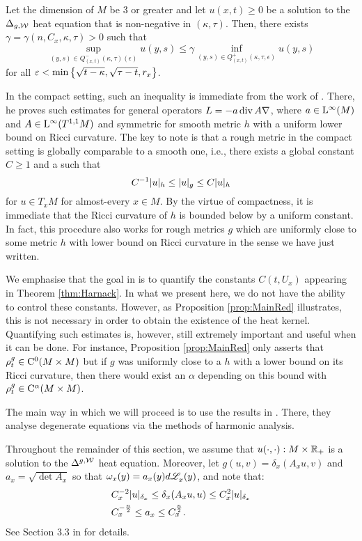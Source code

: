 \documentclass[a4paper, 12pt]{amsart}
\begin{document}
\begin{thm}
\label{thm:Harnack}
Let the dimension of $M$ be $3$ or greater 
and let $u(x,t) \geq 0$ be a 
solution to the $\Delta_{g,\mathcal{W}}$ heat equation 
that is non-negative in $(\kappa, \tau)$. 
Then, there exists $\gamma = \gamma(n, C_x, \kappa, \tau) > 0$ such that 
$$ \sup_{(y,s) \in Q^-_{(x,t)}(\kappa, \tau)(\epsilon)} u(y, s) 
	\leq \gamma \inf_{(y,s) \in Q^+_{(x,t)}(\kappa,\tau,\epsilon)} u(y,s)$$
for all $\varepsilon < \min\left\{ \sqrt{t - \kappa}, \sqrt{\tau - t}, r_x\right\}$.
\end{thm} 

In the compact setting, such an inequality 
is immediate from the work of \cite{SC}. There, 
he proves such estimates for general operators
$L = -a \operatorname{div} A \nabla$, where $a \in {\rm L}^{\infty}_{\rm {}}(M)$
and $A \in {\rm L}^{\infty}_{\rm {}}(T^{1,1}M)$ and symmetric
for smooth metric $h$ with a uniform lower bound
on Ricci curvature.
The key to note is that a rough metric in the 
compact setting is globally comparable to a smooth one, 
i.e., there exists a global constant $C \geq 1$ 
and a 
such that
$$ C^{-1} |u|_{h} \leq |u|_g \leq C |u|_{h}$$
for $u \in T_x M$ for almost-every $x \in M$.
By the virtue of compactness, it is immediate
that the Ricci curvature of $h$ is bounded below
by a uniform constant. 
In fact, this procedure also works 
for rough metrics $g$ which 
are uniformly close to some metric $h$ with 
lower bound on Ricci curvature in the sense
we have just written.

We emphasise that the goal in \cite{SC}
is to quantify the constants $C(t,U_x)$
appearing in Theorem \ref{thm:Harnack}. In what we present here, we do not have
the ability to control these constants. However, as
Proposition \ref{prop:MainRed} illustrates, this is not necessary 
in order to obtain the existence of the heat kernel.
Quantifying such estimates is, however, still 
extremely important and useful when it can be done.
For instance, Proposition \ref{prop:MainRed} 
only asserts that $\rho^{g}_t \in {\rm C}^{0}_{\rm {}}(M \times M)$
but if $g$ was uniformly close to a $h$
with a lower bound on its Ricci curvature, then
there would exist an $\alpha$ depending on this bound
with $\rho^{g}_t \in {\rm C}^{\alpha}_{\rm {}}(M \times M)$.

The main way in which we will proceed is to use the
results in \cite{CS}. There, they analyse
degenerate equations via the methods of harmonic analysis.

Throughout the remainder of this section,
we assume that $u(\cdot, \cdot): M \times \mathbb{R}_+$ 
is a solution to the $\Delta^{g,\mathcal{W}}$ heat equation.
Moreover, let $g(u,v) = \delta_x(A_x u,v)$
and $a_x = \sqrt{\det A_x}$ so that
$\omega_x(y) = a_x(y)d\mathscr{L}^{{}}_x(y)$, and note
that:
\begin{equation}
\label{eq:constbd}
\begin{split}
&C_x^{-2} |u|_{\delta_x} \leq \delta_x(A_x u, u) \leq C_x^2 |u|_{\delta_x} \\
&C_x^{-\frac{n}{2}} \leq a_x \leq C_x^{\frac{n}{2}}.
\end{split}
\end{equation}
See Section 3.3 in \cite{BRough} for details. 
\end{document}
